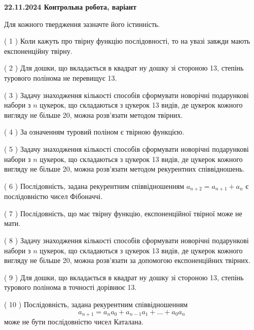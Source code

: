 \documentclass[12pt, ukrainian]{article}
\begin{document}
\vspace{4mm}
\newpage
\begin {large}

\textbf{22.11.2024 Контрольна робота, варіант  }\par


{
Для кожного твердження зазначте його істинність.\par
\vspace{2mm}
( 1 ) Коли кажуть про твірну функцію послідовності, то на увазі завжди мають експоненційну твірну.%

( 2 ) Для дошки, що вкладається в квадрат ну дошку зі стороною 13, степінь турового полінома не перевищує 13.%

( 3 ) Задачу знаходження кількості способів сформувати новорічні подарункові набори з $n$ цукерок, що складаються з цукерок 13 видів, де цукерок кожного вигляду не більше 20, можна розв’язати методом твірних.%

( 4 ) За означенням туровий поліном є твірною функцією.%

( 5 ) Задачу знаходження кількості способів сформувати новорічні подарункові набори з $n$ цукерок, що складаються з цукерок 13 видів, де цукерок кожного вигляду не більше 20, можна розв’язати методом рекурентних співвідношень.%

( 6 ) Послідовність, задана рекурентним співвідношенням $a_{n+2}=a_{n+1}+a_{n}$ є послідовністю чисел Фібоначчі.%

( 7 ) Послідовність, що має твірну функцію, експоненційної твірної може не мати.%

( 8 ) Задачу знаходження кількості способів сформувати новорічні подарункові набори з $n$ цукерок, що складаються з цукерок 13 видів, де цукерок кожного вигляду не більше 20, можна розв’язати за допомогою експоненційних твірних.%

( 9 ) Для дошки, що вкладається в квадрат ну дошку зі стороною 13, степінь турового полінома в точності дорівнює 13.%

( 10 ) Послідовність, задана рекурентним співвідношенням $$a_{n+1}=a_{n}a_{0}+a_{n-1}a_{1}+\ldots+a_0a_{n}$$ може не бути послідовністю чисел Каталана.%


\vspace{5mm}
}
\end {large}
\end{document}
